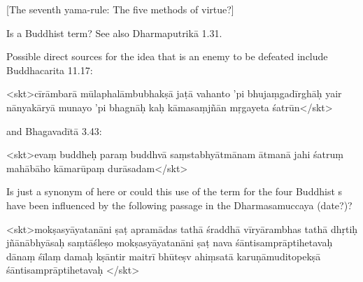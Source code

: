 \begin{center}
{{[The seventh yama-rule: The five methods of virtue?]}}
\end{center}









{ Is  a Buddhist term? See also Dharmaputrikā 1.31. }





{ Possible direct sources for the idea that  is an enemy to be defeated include                 Buddhacarita 11.17: 

         <skt>cīrāmbarā mūlaphalāmbubhakṣā
               jaṭā vahanto 'pi bhujaṃgadīrghāḥ\danda
               yair nānyakāryā munayo 'pi bhagnāḥ
               kaḥ kāmasaṃjñān mṛgayeta śatrūn\twodanda</skt> 

          and Bhagavadītā 3.43:         

         <skt>evaṃ buddheḥ paraṃ buddhvā saṃstabhyātmānam ātmanā\danda
              jahi śatruṃ mahābāho kāmarūpaṃ durāsadam\twodanda</skt>  }





{ Is  just a synonym of  here or                  could this use of the term  for the four Buddhist                  s have been influenced by the following passage in the Dharmasamuccaya (date?)?         

                         <skt>mokṣasyāyatanāni ṣaṭ\danda
                         apramādas tathā śraddhā vīryārambhas tathā dhṛtiḥ\danda
                         jñānābhyāsaḥ saṃtāśleṣo mokṣasyāyatanāni ṣaṭ\twodanda
                         nava śāntisamprāptihetavaḥ\danda
                         dānaṃ śīlaṃ damaḥ kṣāntir maitrī bhūteṣv ahiṃsatā\danda
                         karuṇāmuditopekṣā śāntisamprāptihetavaḥ\twodanda
</skt>  }





